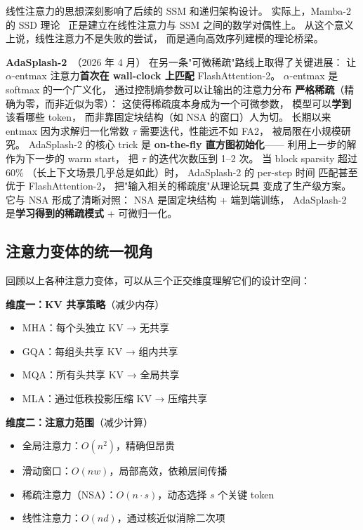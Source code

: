 线性注意力的思想深刻影响了后续的 SSM 和递归架构设计。
实际上，Mamba-2 的 SSD 理论~\cite{dao2024mamba2}
正是建立在线性注意力与 SSM 之间的数学对偶性上。
从这个意义上说，线性注意力不是失败的尝试，
而是通向高效序列建模的理论桥梁。

\textbf{AdaSplash-2}~\cite{adasplash22026}（2026 年 4 月）
在另一条"可微稀疏"路线上取得了关键进展：
让 $\alpha$-entmax 注意力\textbf{首次在 wall-clock 上匹配}
FlashAttention-2。
$\alpha$-entmax 是 softmax 的一个广义化，
通过控制熵参数可以让输出的注意力分布
\textbf{严格稀疏}（精确为零，而非近似为零）：
这使得稀疏度本身成为一个可微参数，
模型可以\textbf{学到}该看哪些 token，
而非靠固定块结构（如 NSA 的窗口）人为切。
长期以来 entmax 因为求解归一化常数 $\tau$
需要迭代，性能远不如 FA2，
被局限在小规模研究。
AdaSplash-2 的核心 trick 是
\textbf{on-the-fly 直方图初始化}——
利用上一步的解作为下一步的 warm start，
把 $\tau$ 的迭代次数压到 1--2 次。
当 block sparsity 超过 60\%
（长上下文场景几乎总是如此）时，
AdaSplash-2 的 per-step 时间
匹配甚至优于 FlashAttention-2，
把"输入相关的稀疏度"从理论玩具
变成了生产级方案。
它与 NSA 形成了清晰对照：
NSA 是固定块结构 + 端到端训练，
AdaSplash-2 是\textbf{学习得到的稀疏模式} + 可微归一化。

\subsection{注意力变体的统一视角}

回顾以上各种注意力变体，可以从三个正交维度理解它们的设计空间：

\textbf{维度一：KV 共享策略}（减少内存）
\begin{itemize}[noitemsep]
  \item MHA：每个头独立 KV → 无共享
  \item GQA：每组头共享 KV → 组内共享
  \item MQA：所有头共享 KV → 全局共享
  \item MLA：通过低秩投影压缩 KV → 压缩共享
\end{itemize}

\textbf{维度二：注意力范围}（减少计算）
\begin{itemize}[noitemsep]
  \item 全局注意力：$O(n^2)$，精确但昂贵
  \item 滑动窗口：$O(nw)$，局部高效，依赖层间传播
  \item 稀疏注意力（NSA）：$O(n \cdot s)$，动态选择 $s$ 个关键 token
  \item 线性注意力：$O(nd)$，通过核近似消除二次项
\end{itemize}

